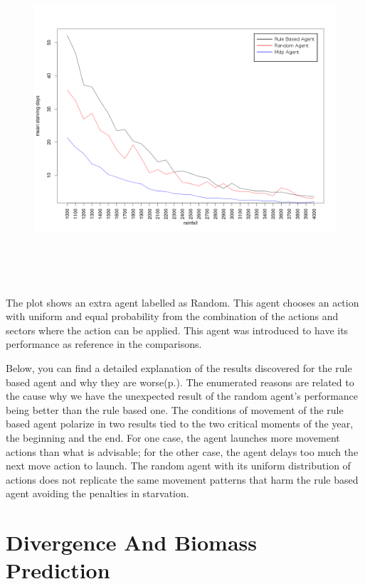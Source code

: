 \documentclass[11pt,oneside,a4paper,openright]{report}
\begin{document}
\begin{figure}[!htb]
\centering
\includegraphics[height=12.2cm]{figures/expm/meanBoxplots_Rain1000to4000_rule_rand_mdp}
\caption{}
\label{fig:meanBoxplots_Rain1000to4000_rule_rand_mdp}
\end{figure}

The plot shows an extra agent labelled as Random. This agent chooses an action with uniform and equal 
probability from the combination of the actions and sectors where the action can be applied. This agent 
was introduced to have its performance as reference in the comparisons. 

Below, you can find a detailed explanation of the results discovered for the rule based agent and why they 
are worse(p.\pageref{sec:expEcsi1}).
The enumerated reasons are related to the cause why we have the unexpected result of the random agent's 
performance being better than the rule based one. The conditions of movement of the rule based agent polarize
in two results tied to the two critical moments of the year, the beginning and the end. 
For one case, the agent launches more movement actions than what is advisable; for the other case, the agent
delays too much the next move action to launch. The random agent with its uniform distribution of actions does 
not replicate the same movement patterns that harm the rule based agent avoiding the penalties in starvation.

\section{Divergence And Biomass Prediction}
\end{document}
